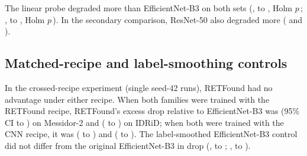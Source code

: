 \documentclass[pdflatex,sn-basic,Numbered]{sn-jnl}
\begin{document}
The linear probe degraded more than EfficientNet-B3 on both sets (,  to , Holm $p$\,; ,  to , Holm $p$\,). In the secondary comparison, ResNet-50 also degraded more ( and ).





\subsection{Matched-recipe and label-smoothing controls}

In the crossed-recipe experiment (single seed-42 runs), RETFound had no advantage under either recipe. When both families were trained with the RETFound recipe, RETFound's excess drop relative to EfficientNet-B3 was  (95\% CI  to ) on Messidor-2 and  ( to ) on IDRiD; when both were trained with the CNN recipe, it was  ( to ) and  ( to ). The label-smoothed EfficientNet-B3 control did not differ from the original EfficientNet-B3 in drop (,  to ; ,  to ).
\end{document}
